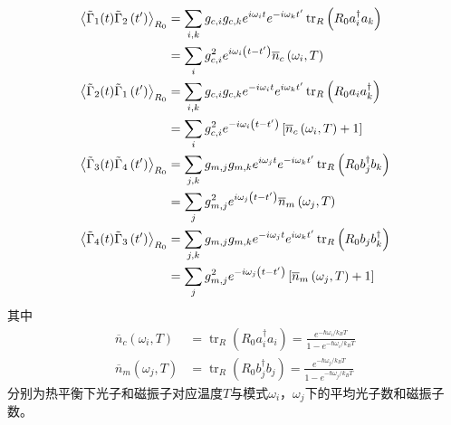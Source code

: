 \begin{align}
\left\langle\tilde{\Gamma}_{1}(t) \tilde{\Gamma}_{2}\left(t^{\prime}\right)\right\rangle_{R_0} &=\sum_{i, k} g_{c,i} g_{c,k} e^{i \omega_{i} t} e^{-i \omega_{k} t^{\prime}} \operatorname{tr}_{R}\left(R_{0} a_{i}^{\dag} a_{k}\right) \notag \\
&=\sum_{i} g_{c,i}^{2} e^{i \omega_{i}\left(t-t^{\prime}\right)} \overline{n}_c\left(\omega_{i}, T\right) \label{Correlations1} \\
\left\langle\tilde{\Gamma}_{2}(t) \tilde{\Gamma}_{1}\left(t^{\prime}\right)\right\rangle_{R_0} &=\sum_{i, k} g_{c,i} g_{c,k} e^{-i \omega_{i} t} e^{i \omega_{k} t^{\prime}} \operatorname{tr}_{R}\left(R_{0} a_{i} a_{k}^{\dag}\right) \notag \\
&=\sum_{i} g_{c,i}^{2} e^{-i \omega_{i}\left(t-t^{\prime}\right)} \left[\overline{n}_c \left(\omega_{i}, T\right)+1\right] \\
\left\langle\tilde{\Gamma}_{3}(t) \tilde{\Gamma}_{4}\left(t^{\prime}\right)\right\rangle_{R_0} &=\sum_{j, k} g_{m,j} g_{m,k} e^{i \omega_{j} t} e^{-i \omega_{k} t^{\prime}} \operatorname{tr}_{R}\left(R_{0} b_{j}^{\dagger} b_{k}\right) \notag \\
&=\sum_{j} g_{m,j}^{2} e^{i \omega_{j}\left(t-t^{\prime}\right)} \overline{n}_m\left(\omega_{j}, T\right) \\
\left\langle\tilde{\Gamma}_{4}(t) \tilde{\Gamma}_{3}\left(t^{\prime}\right)\right\rangle_{R_0} &=\sum_{j, k} g_{m,j} g_{m,k} e^{-i \omega_{j} t} e^{i \omega_{k} t^{\prime}} \operatorname{tr}_{R}\left(R_{0} b_{j} b_{k}^{\dagger}\right) \notag \\
&=\sum_{j} g_{m,j}^{2} e^{-i \omega_{j}\left(t-t^{\prime}\right)}\left[\overline{n}_m\left(\omega_{j}, T\right)+1\right] \label{Correlations4}
\end{align}
其中
\begin{equation}
\begin{aligned}
\overline{n}_c\left(\omega_{i}, T\right) &=\operatorname{tr}_{R}\left(R_{0} a_{i}^{\dagger} a_{i}\right)=\frac{e^{-\hbar \omega_{i} / k_{B} T}}{1-e^{-\hbar \omega_{i} / k_{B} T}}
\\
\overline{n}_m\left(\omega_{j}, T\right) &=\operatorname{tr}_{R}\left(R_{0} b_{j}^{\dagger} b_{j}\right)=\frac{e^{-\hbar \omega_{j} / k_{B} T}}{1-e^{-\hbar \omega_{j} / k_{B} T}}
\end{aligned}
\end{equation}
分别为热平衡下光子和磁振子对应温度$T$与模式$\omega_{i}$，$\omega_{j}$下的平均光子数和磁振子数。

